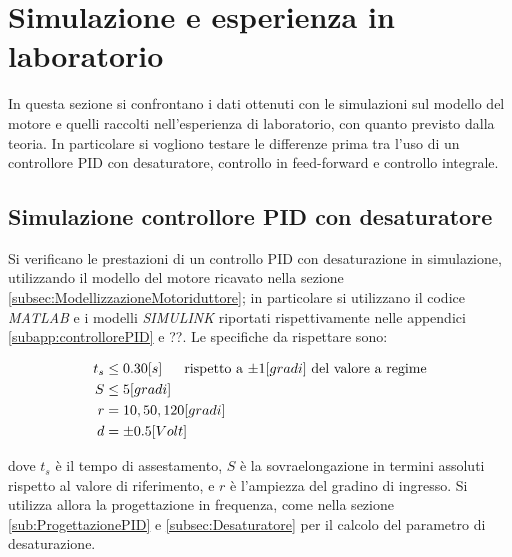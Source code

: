 \section{Simulazione e esperienza in laboratorio}
\label{sec:simLab}

	In questa sezione si confrontano i dati ottenuti con le simulazioni sul modello del motore e quelli raccolti nell'esperienza di laboratorio, con quanto previsto dalla teoria. In particolare si vogliono testare le differenze prima tra l'uso di un controllore PID con desaturatore, controllo in feed-forward e controllo integrale.
	
	\subsection{Simulazione controllore PID con desaturatore}
	\label{subsec:PIDvsPIDdesa}
	
		Si verificano le prestazioni di un controllo PID con desaturazione in simulazione, utilizzando il modello del motore ricavato nella sezione \ref{subsec:ModellizzazioneMotoriduttore}; in particolare si utilizzano il codice \textit{MATLAB} e i modelli \textit{SIMULINK} riportati rispettivamente nelle appendici \ref{subapp:controllorePID} e ??. 
		\newline Le specifiche da rispettare sono:
		
		\begin{align*}
			t_s &\le 0.30 [s] \trippleSpacing \textnormal{rispetto a $\pm 1 [gradi]$ del valore a regime} \\
			S &\le 5 [gradi] \\
			r &= 10,50,120 [gradi] \\
			d &= \pm 0.5 [Volt] \\
		\end{align*}
		
		\noindent dove $t_s$ è il tempo di assestamento, $S$ è la sovraelongazione in termini assoluti rispetto al valore di
		riferimento, e $r$ è l'ampiezza del gradino di ingresso. Si utilizza allora la progettazione in frequenza, come nella sezione \ref{sub:ProgettazionePID} e \ref{subsec:Desaturatore} per il calcolo del parametro di desaturazione. 